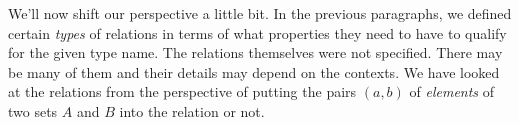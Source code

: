 





\medskip
\medskip
We'll now shift our perspective a little bit. In the previous paragraphs, we defined certain \emph{types} of relations in terms of what properties they need to have to qualify for the given type name. The relations themselves were not specified. There may be many of them and their details may depend on the contexts. We have looked at the relations from the perspective of putting the pairs $(a,b)$ of \emph{elements} of two sets $A$ and $B$ into the relation or not. 

